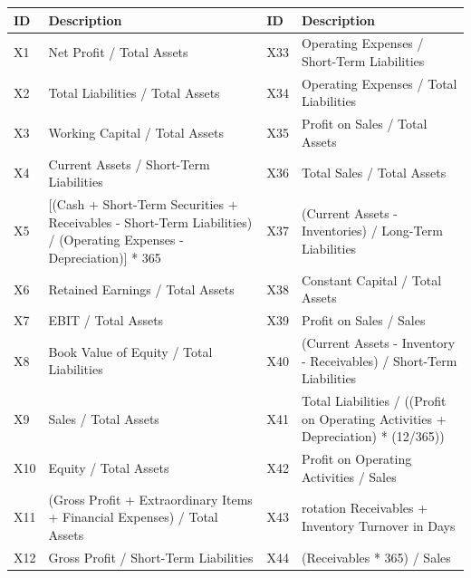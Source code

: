 \begin{table}
\begin{center}
\small
 \begin{tabular}{|p{0.65cm}|p{6.5cm}|p{0.65cm}|p{6.5cm}|} 
\hline
 ID  & Description & ID  & Description \\ [0.5ex] 
\hline\hline
 
    X1 & Net Profit / Total Assets & X33 & Operating Expenses / Short-Term Liabilities \\ \hline

    X2 & Total Liabilities / Total Assets & X34 & Operating Expenses / Total Liabilities \\ \hline

    X3 & Working Capital / Total Assets & X35 & Profit on Sales / Total Assets \\ \hline

    X4 & Current Assets / Short-Term Liabilities & X36 & Total Sales / Total Assets \\ \hline

    X5 & [(Cash + Short-Term Securities + Receivables - Short-Term Liabilities) / (Operating Expenses - Depreciation)] * 365 & X37 & (Current Assets - Inventories) / Long-Term Liabilities \\ \hline

    X6 & Retained Earnings / Total Assets & X38 & Constant Capital / Total Assets \\ \hline

    X7 & EBIT / Total Assets & X39 & Profit on Sales / Sales \\ \hline

    X8 & Book Value of Equity / Total Liabilities & X40 & (Current Assets - Inventory - Receivables) / Short-Term Liabilities \\ \hline

    X9 & Sales / Total Assets & X41 & Total Liabilities / ((Profit on Operating Activities + Depreciation) * (12/365)) \\ \hline

    X10 & Equity / Total Assets & X42 & Profit on Operating Activities / Sales \\ \hline

    X11 & (Gross Profit + Extraordinary Items + Financial Expenses) / Total Assets & X43 & rotation Receivables + Inventory Turnover in Days \\ \hline

    X12 & Gross Profit / Short-Term Liabilities & X44 & (Receivables * 365) / Sales \\ \hline


\end{tabular}
\end{center}
\end{table}
